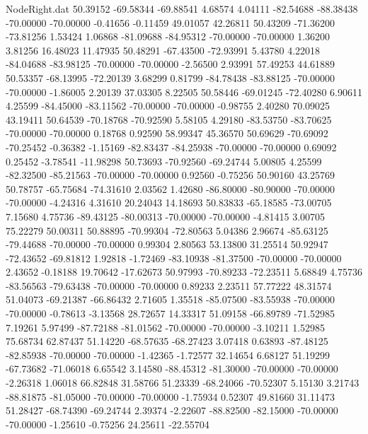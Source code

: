 \begin{filecontents}{NodeRight.dat}
  50.39152  -69.58344  -69.88541     4.68574    4.04111  -82.54688  -88.38438  -70.00000  -70.00000   -0.41656   -0.11459   49.01057   42.26811
  50.43209  -71.36200  -73.81256     1.53424    1.06868  -81.09688  -84.95312  -70.00000  -70.00000    1.36200    3.81256   16.48023   11.47935
  50.48291  -67.43500  -72.93991     5.43780    4.22018  -84.04688  -83.98125  -70.00000  -70.00000   -2.56500    2.93991   57.49253   44.61889
  50.53357  -68.13995  -72.20139     3.68299    0.81799  -84.78438  -83.88125  -70.00000  -70.00000   -1.86005    2.20139   37.03305    8.22505
  50.58446  -69.01245  -72.40280     6.90611    4.25599  -84.45000  -83.11562  -70.00000  -70.00000   -0.98755    2.40280   70.09025   43.19411
  50.64539  -70.18768  -70.92590     5.58105    4.29180  -83.53750  -83.70625  -70.00000  -70.00000    0.18768    0.92590   58.99347   45.36570
  50.69629  -70.69092  -70.25452    -0.36382   -1.15169  -82.83437  -84.25938  -70.00000  -70.00000    0.69092    0.25452   -3.78541  -11.98298
  50.73693  -70.92560  -69.24744     5.00805    4.25599  -82.32500  -85.21563  -70.00000  -70.00000    0.92560   -0.75256   50.90160   43.25769
  50.78757  -65.75684  -74.31610     2.03562    1.42680  -86.80000  -80.90000  -70.00000  -70.00000   -4.24316    4.31610   20.24043   14.18693
  50.83833  -65.18585  -73.00705     7.15680    4.75736  -89.43125  -80.00313  -70.00000  -70.00000   -4.81415    3.00705   75.22279   50.00311
  50.88895  -70.99304  -72.80563     5.04386    2.96674  -85.63125  -79.44688  -70.00000  -70.00000    0.99304    2.80563   53.13800   31.25514
  50.92947  -72.43652  -69.81812     1.92818   -1.72469  -83.10938  -81.37500  -70.00000  -70.00000    2.43652   -0.18188   19.70642  -17.62673
  50.97993  -70.89233  -72.23511     5.68849    4.75736  -83.56563  -79.63438  -70.00000  -70.00000    0.89233    2.23511   57.77222   48.31574
  51.04073  -69.21387  -66.86432     2.71605    1.35518  -85.07500  -83.55938  -70.00000  -70.00000   -0.78613   -3.13568   28.72657   14.33317
  51.09158  -66.89789  -71.52985     7.19261    5.97499  -87.72188  -81.01562  -70.00000  -70.00000   -3.10211    1.52985   75.68734   62.87437
  51.14220  -68.57635  -68.27423     3.07418    0.63893  -87.48125  -82.85938  -70.00000  -70.00000   -1.42365   -1.72577   32.14654    6.68127
  51.19299  -67.73682  -71.06018     6.65542    3.14580  -88.45312  -81.30000  -70.00000  -70.00000   -2.26318    1.06018   66.82848   31.58766
  51.23339  -68.24066  -70.52307     5.15130    3.21743  -88.81875  -81.05000  -70.00000  -70.00000   -1.75934    0.52307   49.81660   31.11473
  51.28427  -68.74390  -69.24744     2.39374   -2.22607  -88.82500  -82.15000  -70.00000  -70.00000   -1.25610   -0.75256   24.25611  -22.55704

\end{filecontents}
